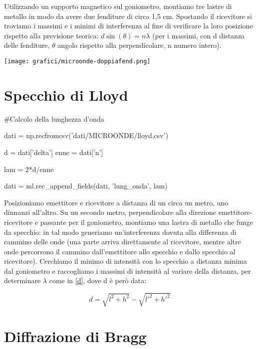 Utilizzando un supporto magnetico sul goniometro, montiamo tre lastre di metallo in modo da avere due
fenditure di circa 1,5 cm. Spostando il ricevitore si troviamo i massimi e i minimi di interferenza al fine di verificare la
loro posizione rispetto alla previsione teorica: $d \sin(\theta) = n \lambda$ (per i massimi, con d distanza delle fenditure, $\theta$ angolo
rispetto alla perpendicolare, n numero intero).

\texttt{[image: grafici/microonde-doppiafend.png]}

\section{Specchio di Lloyd}

\begin{sagesilent}
#Calcolo della lunghezza d'onda

dati = np.recfromcsv('dati/MICROONDE/lloyd.csv')

d = dati['delta']
enne = dati['n']

lam = 2*d/enne


dati = ml.rec_append_fields(dati, 'lung_onda', lam)

\end{sagesilent}

Posizioniamo emettitore e ricevitore a distanza di un circa un metro, uno dinnanzi all'altro. Su un secondo metro, perpendicolare alla direzione emettitore-ricevitore e passante per il goniometro, montiamo una lastra di metallo che funge da specchio: in tal modo generiamo un'interferenza dovuta alla differenza di cammino delle onde (una parte arriva direttamente al ricevitore, mentre altre onde percorrono il cammino dall'emettitore allo specchio e dallo specchio al ricevitore). Cerchiamo il minimo di intensità con lo specchio a distanza minima dal goniometro e raccogliamo i massimi di intensità al variare della distanza, per determinare $\lambda$ come in \ref{d}, dove d è però data:

$$ d = \sqrt{l^2 + h^2} - \sqrt{l'^2 + h'^2} $$

\begin{center}
\end{center}

\section{Diffrazione di Bragg}

